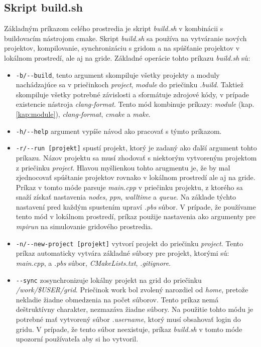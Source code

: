 \subsection{Skript build.sh}
Základným príkazom celého prostredia je skript \textit{build.sh} v kombinácii s buildovacím nástrojom cmake.
Skript \textit{build.sh} sa používa na vytváranie nových projektov, kompilovanie,
synchronizáciu s gridom a na spúšťanie projektov v lokálnom prostredí, ale aj na gride.
Základné operácie tohto príkazu \textit{build.sh} sú:
\begin{itemize}
\item
  \texttt{-b/-{}-build}, tento argument skompiluje všetky projekty a moduly nachádzajúce sa v priečinkoch \textit{project}, \textit{module} do priečinku \textit{.build}.
  Taktiež skompiluje všetky potrebné závislosti a sformátuje zdrojové kódy, v prípade existencie nástroja \textit{clang-format}.
  Tento mód kombinuje príkazy: \textit{module} (kap. \ref{kap:module}), \textit{clang-format}, \textit{cmake} a \textit{make}.
\item
  \texttt{-h/-{}-help} argument vypíše návod ako pracovať s týmto príkazom.
\item
  \texttt{-r/-{}-run [projekt]} spustí projekt, ktorý je zadaný ako ďalší argument tohto príkazu.
  Názov projektu sa musí zhodovať s niektorým vytvoreným projektom z priečinku \textit{project}.
  Hlavou myšlienkou tohto arugmentu je, že by mal zjednocovať spúštanie projektov rovnako v lokálnom prostredí ale aj na gride.
  Príkaz v tomto móde parsuje \textit{main.cpp} v priečinku projektu, z ktorého sa snaží získať nastavenia \textit{nodes}, \textit{ppn}, \textit{walltime} a \textit{queue}.
  Na základe týchto nastavení pred každým spustením upraví \textit{.pbs} súbor.
  V prípade, že používame tento mód v lokálnom prostredí,
  príkaz použije nastavenia ako argumenty pre \textit{mpirun} na simulovanie gridového prostredia.
\item
  \texttt{-n/-{}-new-project [projekt]} vytvorí projekt do priečinku \textit{project}.
  Tento príkaz automaticky vytvára základné súbory pre projekt, ktorými sú: \textit{main.cpp}, a \textit{.pbs} súbor, \textit{CMakeLists.txt}, \textit{.gitignore}.
\item
  \texttt{-{}-sync} zosynchronizuje lokálny projekt na grid do priečinku \textit{/work/\$USER/grid}.
  Priečinok work bol zvolený narozdiel od \textit{home}, pretože nekladie žiadne obmedzenia na počet súborov.
  Tento príkaz nemá deštruktívny charakter, nezmazáva žiadne súbory.
  Na použitie tohto módu je potrebné mať vytvorený súbor \textit{.username}, ktorý musí obsahovať login do gridu.
  V prípade, že tento súbor neexistuje, príkaz \textit{build.sh} v tomto móde upozorní používateľa aby si ho vytvoril.  
\end{itemize}

